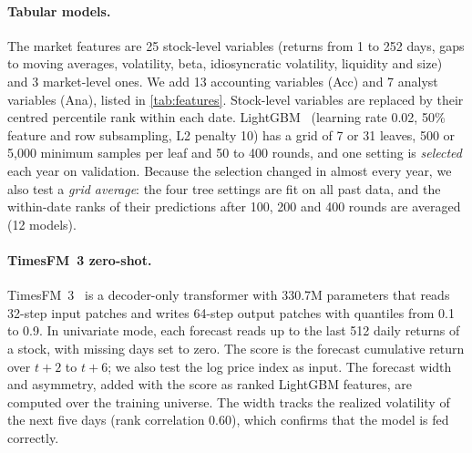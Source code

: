 \paragraph{Tabular models.}
The market features are 25 stock-level variables (returns from 1 to 252 days, gaps to moving averages, volatility, beta, idiosyncratic volatility, liquidity and size) and 3 market-level ones.
We add 13 accounting variables (Acc) and 7 analyst variables (Ana), listed in \cref{tab:features}.
Stock-level variables are replaced by their centred percentile rank within each date.
LightGBM~\cite{ke2017lightgbm} (learning rate 0.02, 50\% feature and row subsampling, L2 penalty 10) has a grid of 7 or 31 leaves, 500 or 5,000 minimum samples per leaf and 50 to 400 rounds, and one setting is \emph{selected} each year on validation.
Because the selection changed in almost every year, we also test a \emph{grid average}: the four tree settings are fit on all past data, and the within-date ranks of their predictions after 100, 200 and 400 rounds are averaged (12 models).

\paragraph{TimesFM~3 zero-shot.}
TimesFM~3~\cite{timesfm3} is a decoder-only transformer with 330.7M parameters that reads 32-step input patches and writes 64-step output patches with quantiles from 0.1 to 0.9.
In univariate mode, each forecast reads up to the last 512 daily returns of a stock, with missing days set to zero.
The score is the forecast cumulative return over $t{+}2$ to $t{+}6$; we also test the log price index as input.
The forecast width and asymmetry, added with the score as ranked LightGBM features, are computed over the training universe.
The width tracks the realized volatility of the next five days (rank correlation 0.60), which confirms that the model is fed correctly.

